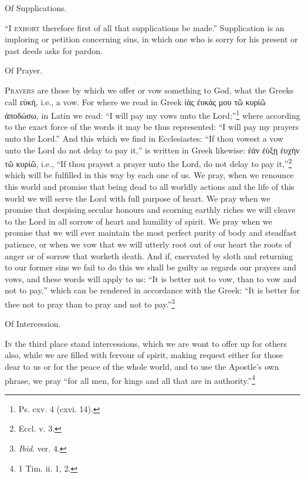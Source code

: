Of Supplications.

“I \textsc{exhort} therefore first of all that supplications be made.” Supplication is an imploring or petition concerning sins, in which one who is sorry for his present or past deeds asks for pardon.


Of Prayer.

\textsc{Prayers} are those by which we offer or vow something to God, what the Greeks call \textgreek{εὐκή}, i.e., a vow. For where we read in Greek \textgreek{ἰὰς ἐυκάς μου τῶ κυρίῶ ἀποδώσω}, in Latin we read: “I will pay my vows unto the Lord;”\footnote{Ps. cxv. 4 (cxvi. 14).} where according to the exact force of the words it may be thus represented: “I will pay my prayers unto the Lord.” And this which we find in Ecclesiastes: “If thou vowest a vow unto the Lord do not delay to pay it,” is written in Greek likewise: \textgreek{ἐάν ἐύξῃ ἐυχὴν τῶ κυρίῶ,} i.e., “If thou prayest a prayer unto the Lord, do not delay to pay it,”\footnote{Eccl. v. 3.} which will be fulfilled in this way by each one of us. We pray, when we renounce this world and promise that being dead to all worldly actions and the life of this world we will serve the Lord with full purpose of heart. We pray when we promise that despising secular honours and scorning earthly riches we will cleave to the Lord in all sorrow of heart and humility of spirit. We pray when we promise that we will ever maintain the most perfect purity of body and steadfast patience, or when we vow that we will utterly root out of our heart the roots of anger or of sorrow that worketh death. And if, enervated by sloth and returning to our former sins we fail to do this we shall be guilty as regards our prayers and vows, and these words will apply to us: “It is better not to vow, than to vow and not to pay,” which can be rendered in accordance with the Greek: “It is better for thee not to pray than to pray and not to pay.”\footnote{\emph{Ibid}. ver. 4.}


Of Intercession.

\textsc{In} the third place stand intercessions, which we are wont to offer up for others also, while we are filled with fervour of spirit, making request either for those dear to us or for the peace of the whole world, and to use the Apostle’s own phrase, we pray “for all men, for kings and all that are in authority.”\footnote{1 Tim. ii. 1, 2.}

